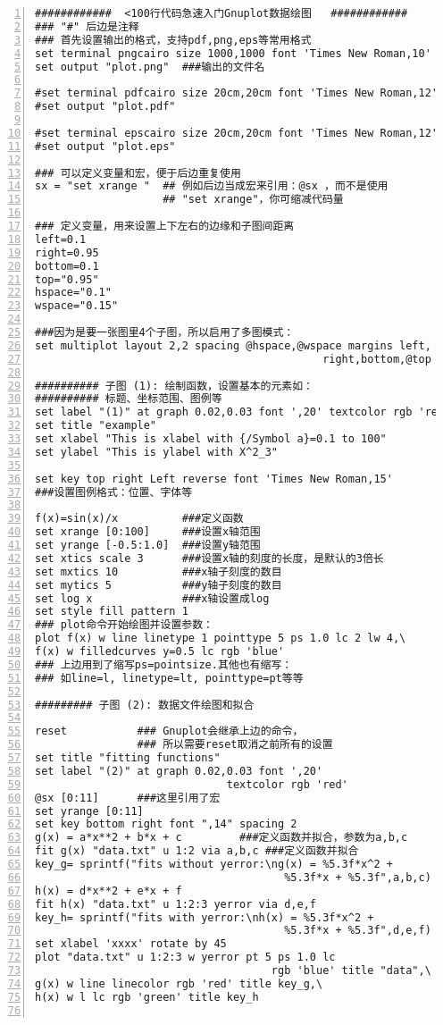 \begin{lstlisting}[numbers=left,frame=single]
############  <100行代码急速入门Gnuplot数据绘图   ############
### "#" 后边是注释
### 首先设置输出的格式，支持pdf,png,eps等常用格式
set terminal pngcairo size 1000,1000 font 'Times New Roman,10'   ## 格式，大小和字体
set output "plot.png"  ###输出的文件名

#set terminal pdfcairo size 20cm,20cm font 'Times New Roman,12'  ## 
#set output "plot.pdf"

#set terminal epscairo size 20cm,20cm font 'Times New Roman,12'  ## 
#set output "plot.eps"

### 可以定义变量和宏，便于后边重复使用
sx = "set xrange "  ## 例如后边当成宏来引用：@sx ，而不是使用 
                    ## "set xrange"，你可缩减代码量

### 定义变量，用来设置上下左右的边缘和子图间距离
left=0.1           
right=0.95
bottom=0.1
top="0.95"
hspace="0.1"
wspace="0.15"

###因为是要一张图里4个子图，所以启用了多图模式：
set multiplot layout 2,2 spacing @hspace,@wspace margins left,
                                             right,bottom,@top

########## 子图 (1): 绘制函数，设置基本的元素如：
########## 标题、坐标范围、图例等
set label "(1)" at graph 0.02,0.03 font ',20' textcolor rgb 'red'
set title "example"
set xlabel "This is xlabel with {/Symbol a}=0.1 to 100"
set ylabel "This is ylabel with X^2_3"

set key top right Left reverse font 'Times New Roman,15'  
###设置图例格式：位置、字体等

f(x)=sin(x)/x          ###定义函数
set xrange [0:100]     ###设置x轴范围
set yrange [-0.5:1.0]  ###设置y轴范围
set xtics scale 3      ###设置x轴的刻度的长度，是默认的3倍长
set mxtics 10          ###x轴子刻度的数目
set mytics 5           ###y轴子刻度的数目
set log x              ###x轴设置成log
set style fill pattern 1
### plot命令开始绘图并设置参数：
plot f(x) w line linetype 1 pointtype 5 ps 1.0 lc 2 lw 4,\
f(x) w filledcurves y=0.5 lc rgb 'blue'
### 上边用到了缩写ps=pointsize.其他也有缩写：
### 如line=l, linetype=lt, pointtype=pt等等

######### 子图 (2): 数据文件绘图和拟合

reset           ### Gnuplot会继承上边的命令，
                ### 所以需要reset取消之前所有的设置
set title "fitting functions"
set label "(2)" at graph 0.02,0.03 font ',20'  
                              textcolor rgb 'red'
@sx [0:11]      ###这里引用了宏
set yrange [0:11]
set key bottom right font ",14" spacing 2
g(x) = a*x**2 + b*x + c         ###定义函数并拟合，参数为a,b,c
fit g(x) "data.txt" u 1:2 via a,b,c ###定义函数并拟合
key_g= sprintf("fits without yerror:\ng(x) = %5.3f*x^2 + 
                                       %5.3f*x + %5.3f",a,b,c)
h(x) = d*x**2 + e*x + f
fit h(x) "data.txt" u 1:2:3 yerror via d,e,f
key_h= sprintf("fits with yerror:\nh(x) = %5.3f*x^2 + 
                                       %5.3f*x + %5.3f",d,e,f)
set xlabel 'xxxx' rotate by 45
plot "data.txt" u 1:2:3 w yerror pt 5 ps 1.0 lc 
                                     rgb 'blue' title "data",\
g(x) w line linecolor rgb 'red' title key_g,\
h(x) w l lc rgb 'green' title key_h


\end{lstlisting}
